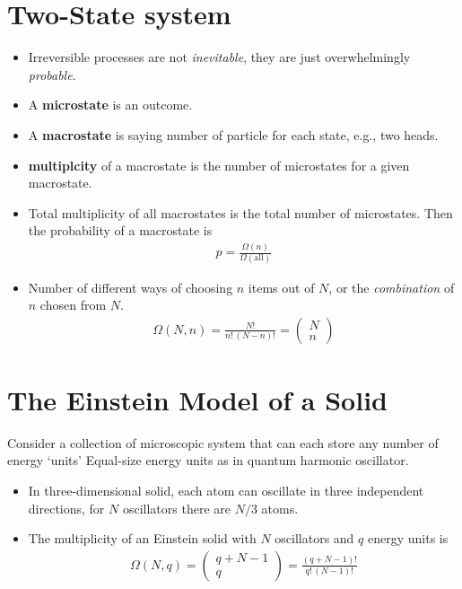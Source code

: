 \documentclass{book}
\begin{document}
\section{Two-State system}%
\label{sec:two state}
\begin{itemize}

	\item Irreversible processes are not \textit{inevitable}, they are just overwhelmingly \textit{probable}.
	\item A \textbf{microstate} is an outcome.
	\item A \textbf{macrostate} is saying number of particle for each state, e.g., two heads.
	\item \textbf{multiplcity} of a macrostate is the number of microstates for a given macrostate.
	\item Total multiplicity of all macrostates is the total number of microstates. Then the probability
	      of a macrostate is
	      \begin{align}
		      p = \frac{\Omega(n)}{\Omega(\text{all})}
	      \end{align}
	\item Number of different ways of choosing $n$ items out of $N$, or the \textit{combination} of $n$
	      chosen from $N$.
	      \begin{align}
		      \label{eq:multiplicity formula}
		      \Omega(N, n) = \frac{N!}{n! \, (N-n)!} =
		      \begin{pmatrix}
			      N \\ n
		      \end{pmatrix}
	      \end{align}
\end{itemize}



\section{The Einstein Model of a Solid}%
\label{sec:einstein model}

Consider a collection of microscopic system that can each store any number of energy `units'
Equal-size energy units as in quantum harmonic oscillator.
\begin{itemize}
	\item In three-dimensional solid, each atom can oscillate in three independent directions, for $N$
	      oscillators there are $N/3$ atoms.
	\item The multiplicity of an Einstein solid with $N$ oscillators and $q$
	      energy units is
	      \begin{align}
		      \label{eq:einstein omega}
		      \Omega(N, q) = \begin{pmatrix}
			                     q + N -1 \\ q
		                     \end{pmatrix} =
		      \frac{(q+N-1)!}{q! \, (N-1)!}
	      \end{align}
\end{itemize}
\end{document}
